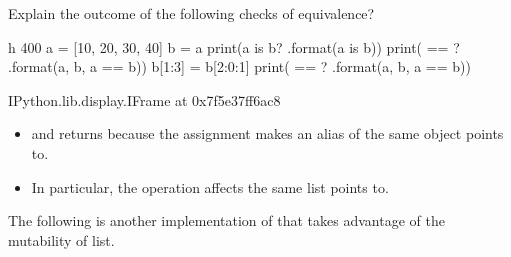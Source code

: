 \documentclass[letterpaper,10pt,english]{sphinxmanual}
\begin{document}
 Explain the outcome of the following checks of equivalence?

\begin{sphinxVerbatim}[commandchars=\\\{\}]
 \PYGZhy{}h 400
a = [10, 20, 30, 40]
b = a
print(\PYGZsq{}a is b? \PYGZob{}\PYGZcb{}\PYGZsq{}.format(a is b))
print(\PYGZsq{}\PYGZob{}\PYGZcb{} == \PYGZob{}\PYGZcb{}? \PYGZob{}\PYGZcb{}\PYGZsq{}.format(a, b, a == b))
b[1:3] = b[2:0:\PYGZhy{}1]
print(\PYGZsq{}\PYGZob{}\PYGZcb{} == \PYGZob{}\PYGZcb{}? \PYGZob{}\PYGZcb{}\PYGZsq{}.format(a, b, a == b))
\end{sphinxVerbatim}

\begin{sphinxVerbatim}[commandchars=\\\{\}]
\PYGZlt{}IPython.lib.display.IFrame at 0x7f5e37ff6ac8\PYGZgt{}
\end{sphinxVerbatim}
\begin{itemize}
\item {} 
 and  returns  because the assignment  makes  an alias of the same object  points to.

\item {} 
In particular, the operation affects the same list  points to.

\end{itemize}


The following is another implementation of  that takes advantage of the mutability of list.
\end{document}

